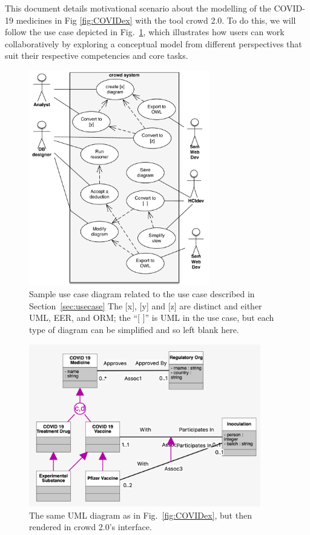 \documentclass[sn-mathphys]{sn-jnl}
\newcommand{\crowdtwo}{{\sf crowd 2.0}\xspace}
\begin{document}
This document details motivational scenario about the modelling of the COVID-19 medicines in Fig \ref{fig:COVIDex} with the tool \crowdtwo. To do this, we will follow the use case depicted in Fig.~\ref{fig:usecase}, which illustrates how users can work collaboratively by exploring a conceptual model from different perspectives that suit their respective competencies and core tasks. %

\begin{figure}[h]
  \centering
   \includegraphics[width=0.7\textwidth]{COVIDdrugsProcessFlowEx2.pdf} 
    \caption{Sample use case diagram related to the use case described in Section~\ref{sec:usecase} The [x], [y] and [z] are distinct and either UML, EER, and ORM; the ``[ ]'' is UML in the use case, but each type of diagram can be simplified and so left blank here.}
    \label{fig:usecase}
\end{figure}

\begin{figure}[h]
  \centering
   \includegraphics[width=0.9\textwidth]{covidUML1.pdf} 
    \caption{The same UML diagram as in Fig.~\ref{fig:COVIDex}, but then rendered in \crowdtwo's interface.}
    \label{fig:UML}
\end{figure}
\end{document}
